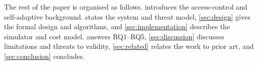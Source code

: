 The rest of the paper is organised as follows.  introduces
the access-control and self-adaptive background.  states
the system and threat model, \cref{sec:design} gives the formal design and
algorithms, and \cref{sec:implementation} describes the simulator and cost model.
 answers RQ1--RQ5, \cref{sec:discussion} discusses
limitations and threats to validity, \cref{sec:related} relates the work to prior
art, and \cref{sec:conclusion} concludes.
